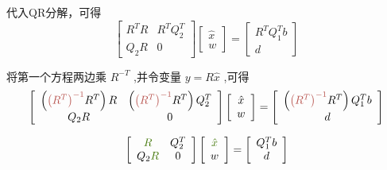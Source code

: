 代入QR分解，可得
\begin{equation}
\left[\begin{array}{cc}
R^{T} R & R^{T} Q_{2}^{T} \\
Q_{2} R & 0
\end{array}\right]\left[\begin{array}{c}
\hat{x} \\
w
\end{array}\right]=\left[\begin{array}{c}
R^{T} Q_{1}^{T} b \\
d
\end{array}\right]
\end{equation}

将第一个方程两边乘 $ R^{-T} $ ,并令变量 $ y=R \hat{x} $ ,可得
\begin{equation}\displaystyle \left[\begin{array}{ c c }
    \left(\textcolor[rgb]{0.72,0.33,0.31}{\left( R^{T}\right)^{-1}} R^{T}\right) R & \left(\textcolor[rgb]{0.72,0.33,0.31}{\left( R^{T}\right)^{-1}} R^{T}\right) Q_{2}^{T}\\
    Q_{2} R & 0
    \end{array}\right]\left[\begin{array}{ c }
    \hat{x}\\
    w
    \end{array}\right] =\left[\begin{array}{ c }
    \left(\textcolor[rgb]{0.72,0.33,0.31}{\left( R^{T}\right)^{-1}} R^{T}\right) Q_{1}^{T} b\\
    d
    \end{array}\right]\end{equation}

\begin{equation}\displaystyle \left[\begin{array}{ c c }
    \textcolor[rgb]{0.25,0.46,0.02}{R} & Q_{2}^{T}\\
    Q_{2}\textcolor[rgb]{0.25,0.46,0.02}{R} & 0
    \end{array}\right]\left[\begin{array}{ c }
    \textcolor[rgb]{0.25,0.46,0.02}{\hat{x}}\\
    w
    \end{array}\right] =\left[\begin{array}{ c }
    Q_{1}^{T} b\\
    d
    \end{array}\right]\end{equation}

